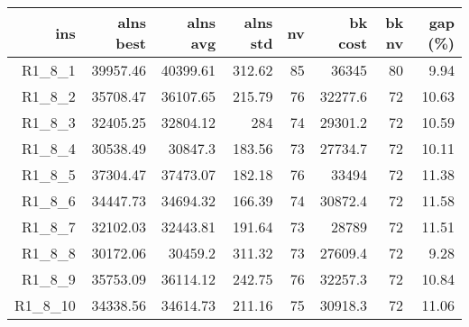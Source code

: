   \begin{table}[caption={Kết quả đo với tập HG\_R\_1\_8 800 yêu cầu}, label=exp:HGR18]
    \centering
    \begin{tabular}{rrrrrrrr}
    \hline
    ins & alns best & alns avg & alns std & nv & bk cost & bk nv & gap (\%) \\ \hline
    R1\_8\_1 & 39957.46 & 40399.61 & 312.62 & 85 & 36345 & 80 & 9.94 \\ \hline
    R1\_8\_2 & 35708.47 & 36107.65 & 215.79 & 76 & 32277.6 & 72 & 10.63 \\ \hline
    R1\_8\_3 & 32405.25 & 32804.12 & 284 & 74 & 29301.2 & 72 & 10.59 \\ \hline
    R1\_8\_4 & 30538.49 & 30847.3 & 183.56 & 73 & 27734.7 & 72 & 10.11 \\ \hline
    R1\_8\_5 & 37304.47 & 37473.07 & 182.18 & 76 & 33494 & 72 & 11.38 \\ \hline
    R1\_8\_6 & 34447.73 & 34694.32 & 166.39 & 74 & 30872.4 & 72 & 11.58 \\ \hline
    R1\_8\_7 & 32102.03 & 32443.81 & 191.64 & 73 & 28789 & 72 & 11.51 \\ \hline
    R1\_8\_8 & 30172.06 & 30459.2 & 311.32 & 73 & 27609.4 & 72 & 9.28 \\ \hline
    R1\_8\_9 & 35753.09 & 36114.12 & 242.75 & 76 & 32257.3 & 72 & 10.84 \\ \hline
    R1\_8\_10 & 34338.56 & 34614.73 & 211.16 & 75 & 30918.3 & 72 & 11.06 \\ \hline
    \end{tabular}
  \end{table}

